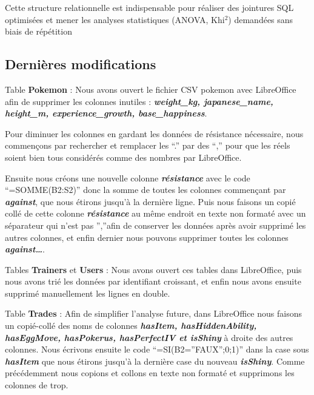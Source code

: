 \documentclass[mstat,12pt]{unswthesis}
\begin{document}
Cette structure relationnelle est indispensable pour réaliser des
jointures SQL optimisées et mener les analyses statistiques (ANOVA,
Khi\(^2\)) demandées sans biais de répétition

\bigskip

\subsection{Dernières modifications}\label{derniuxe8res-modifications}

Table \textbf{Pokemon} : Nous avons ouvert le fichier CSV pokemon avec
LibreOffice afin de supprimer les colonnes inutiles :
\textbf{\emph{weight\_kg, japanese\_name, height\_m, experience\_growth,
base\_happiness}}.

\bigskip

Pour diminuer les colonnes en gardant les données de résistance
nécessaire, nous commençons par rechercher et remplacer les ``.'' par
des ``,'' pour que les réels soient bien tous considérés comme des
nombres par LibreOffice.

\bigskip

Ensuite nous créons une nouvelle colonne \textbf{\emph{résistance}} avec
le code ``=SOMME(B2:S2)'' donc la somme de toutes les colonnes
commençant par \textbf{\emph{against}}, que nous étirons jusqu'à la
dernière ligne. Puis nous faisons un copié collé de cette colonne
\textbf{\emph{résistance}} au même endroit en texte non formaté avec un
séparateur qui n'est pas '',''afin de conserver les données après avoir
supprimé les autres colonnes, et enfin dernier nous pouvons supprimer
toutes les colonnes \textbf{\emph{against\ldots{}}}.

\bigskip

Tables \textbf{Trainers} et \textbf{Users} : Nous avons ouvert ces
tables dans LibreOffice, puis nous avons trié les données par
identifiant croissant, et enfin nous avons ensuite supprimé manuellement
les lignes en double.

\bigskip

Table \textbf{Trades} : Afin de simplifier l'analyse future, dans
LibreOffice nous faisons un copié-collé des noms de colonnes
\textbf{\emph{hasItem, hasHiddenAbility, hasEggMove, hasPokerus,
hasPerfectIV et isShiny}} à droite des autres colonnes. Nous écrivons
ensuite le code ``=SI(B2=''FAUX'';0;1)'' dans la case sous
\textbf{\emph{hasItem}} que nous étirons jusqu'à la dernière case du
nouveau \textbf{\emph{isShiny}}. Comme précédemment nous copions et
collons en texte non formaté et supprimons les colonnes de trop.
\end{document}
